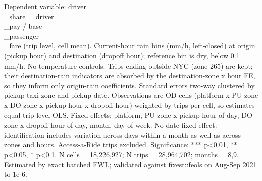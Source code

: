 \par \raggedright 
Dependent variable: driver\\_share = driver\\_pay / base\\_passenger\\_fare (trip level, cell mean). Current-hour rain bins (mm/h, left-closed) at origin (pickup hour) and destination (dropoff hour); reference bin is dry, below 0.1 mm/h. No temperature controls. Trips ending outside NYC (zone 265) are kept; their destination-rain indicators are absorbed by the destination-zone x hour FE, so they inform only origin-rain coefficients. Standard errors two-way clustered by pickup taxi zone and pickup date. Observations are OD cells (platform x PU zone x DO zone x pickup hour x dropoff hour) weighted by trips per cell, so estimates equal trip-level OLS. Fixed effects: platform, PU zone x pickup hour-of-day, DO zone x dropoff hour-of-day, month, day-of-week. No date fixed effect: identification includes variation across days within a month as well as across zones and hours. Access-a-Ride trips excluded. Significance: *** p<0.01, ** p<0.05, * p<0.1. N cells = 18,226,927; N trips = 28,964,702; months = 8,9. Estimated by exact batched FWL; validated against fixest::feols on Aug-Sep 2021 to 1e-6.
\par\endgroup
\ifdefined\ifclassloaded
{}
\fi
